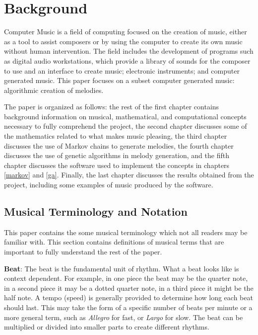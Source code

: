 \chapter{Background} \label{bg}

Computer Music is a field of computing focused on the creation of music, either as a tool to assist composers or by using the computer to create its own music without human intervention.
The field includes the development of programs such as digital audio workstations, which provide a library of sounds for the composer to use and an interface to create music; electronic instruments; and computer generated music.
This paper focuses on a subset computer generated music: algorithmic creation of melodies.

The paper is organized as follows:
the rest of the first chapter contains background information on musical, mathematical, and computational concepts necessary to fully comprehend the project,
the second chapter discusses some of the mathematics related to what makes music pleasing,
the third chapter discusses the use of Markov chains to generate melodies,
the fourth chapter discusses the use of genetic algorithms in melody generation,
and the fifth chapter discusses the software used to implement the concepts in chapters \ref{markov} and \ref{ga}.
Finally, the last chapter discusses the results obtained from the project, including some examples of music produced by the software.

\section{Musical Terminology and Notation} \label{bg:musicTerminology}

This paper contains the some musical terminology which not all readers may be familiar with.
This section contains definitions of musical terms that are important to fully understand the rest of the paper.

\textbf{Beat}: The beat is the fundamental unit of rhythm.
What a beat looks like is context dependent.
For example, in one piece the beat may be the quarter note, in a second piece it may be a dotted quarter note, in a third piece it might be the half note.
A tempo (speed) is generally provided to determine how long each beat should last.
This may take the form of a specific number of beats per minute or a more general term, such as \textit{Allegro} for fast, or \textit{Largo} for slow.
The beat can be multiplied or divided into smaller parts to create different rhythms.

